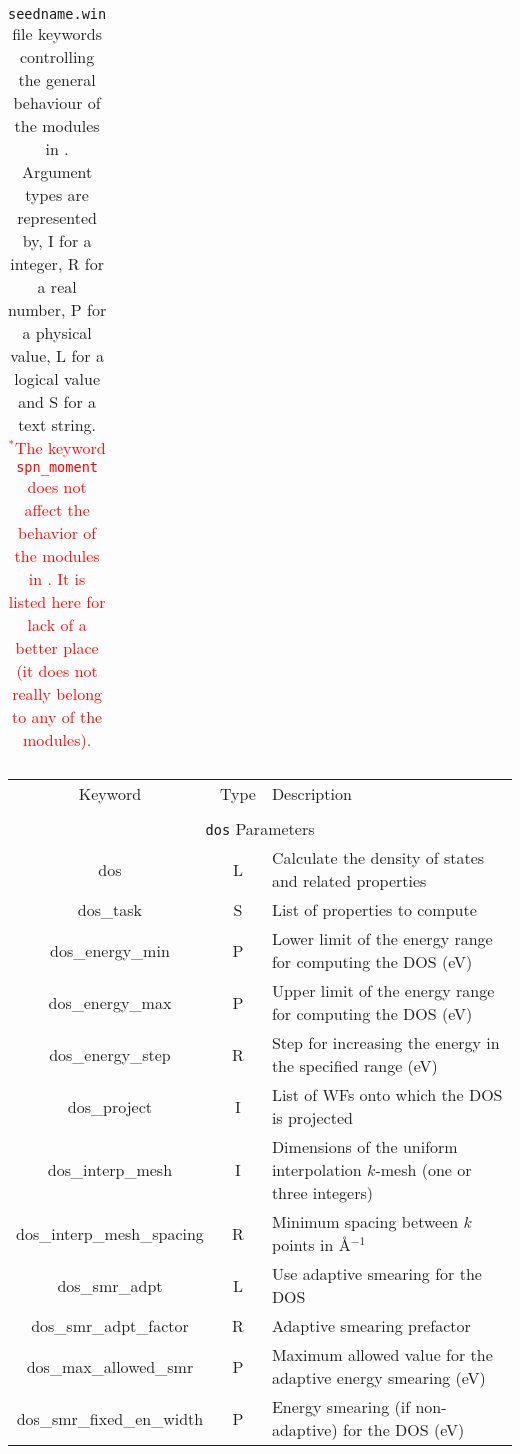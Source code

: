 \begin{table}[hH!]
\begin{center}
\begin{tabular}{|c|c|p{6cm}|}
\end{tabular}
\caption[Parameter file keywords controlling \postw.]  {{\tt
    seedname.win} file keywords controlling the general behaviour of
  the modules in \postw. Argument types are represented by, I for a
  integer, R for a real number, P for a
  physical value, L for a logical value and S for a text string.\\
  \textcolor{red}{$^*$The keyword {\tt spn\_moment} does not affect
    the behavior of the modules in \postw. It is listed here for lack
    of a better place (it does not really belong to any of the
    modules).}}
\label{parameter_keywords_postw90}
\end{center}
\end{table}


\begin{table}[hH!]
\begin{center}
\begin{tabular}{|c|c|p{6cm}|}
  \hline
  Keyword & Type & Description \\
  &      &             \\
  \hline\hline
  \multicolumn{3}{|c|}{{\tt dos} Parameters} \\
  \hline
  {\sc dos}  & L & Calculate the density of states and related properties\\
  {\sc dos\_task}& S  & List of properties to compute \\
  {\sc dos\_energy\_min} & P & Lower limit of the energy range for
  computing the DOS (eV)\\
  {\sc dos\_energy\_max}& P & Upper limit of the energy range for
  computing the DOS (eV)\\
  {\sc dos\_energy\_step}& R & Step for increasing the energy in the specified range (eV)\\
  {\sc dos\_project}& I & List of WFs onto which the DOS is projected\\
  {\sc dos\_interp\_mesh} & I & Dimensions of the uniform interpolation $k$-mesh (one or three integers)\\ 
  {\sc dos\_interp\_mesh\_spacing}& R & Minimum spacing between $k$ points in \AA$^{-1}$\\
  {\sc dos\_smr\_adpt} & L & Use adaptive smearing for the DOS \\
  {\sc dos\_smr\_adpt\_factor} & R & Adaptive smearing prefactor\\
  {\sc dos\_max\_allowed\_smr} & P & Maximum allowed value for the adaptive energy smearing (eV) \\
  {\sc dos\_smr\_fixed\_en\_width} & P  & Energy smearing (if non-adaptive) for the DOS (eV) \\   

\end{tabular}
\end{center}
\end{table}
